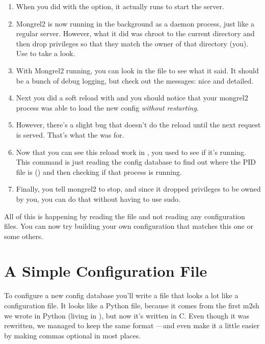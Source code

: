 \begin{enumerate}
\item When you did  with the  option, it actually runs
     to start the server.
\item Mongrel2 is now running in the background as a daemon process, just like a regular server.
    However, what it did was chroot to the current directory and then drop privileges so that
    they match the owner of that directory (you).  Use  to take a look.
\item With Mongrel2 running, you can look in the  file to see what it said.  It should
    be a bunch of debug logging, but check out the messages: nice and detailed.
\item Next you did a soft reload with  and you should notice that your mongrel2
    process was able to load the new config \emph{without restarting}.
\item However, there's a slight bug that doesn't do the reload until the next request is served. That's
    what the  was for.
\item Now that you can see this reload work in , you used  to
    see if it's running.  This command is just reading the config database to find out where the PID file
    is () and then checking if that process is running.
\item Finally, you tell mongrel2 to stop, and since it dropped privileges to be owned by you, you can do
    that without having to use sudo.
\end{enumerate}

All of this is happening by reading the  file and not reading any configuration
files.  You can now try building your own configuration that matches this one or some others.


\section{A Simple Configuration File}

To configure a new config database you'll write a file that looks a lot like
a configuration file.  It looks like a Python file, because it comes from the
first m2sh we wrote in Python (living in ), but now it's
written in C.  Even though it was rewritten, we managed to keep the same format
---and even make it a little easier by making commas optional in most places.

